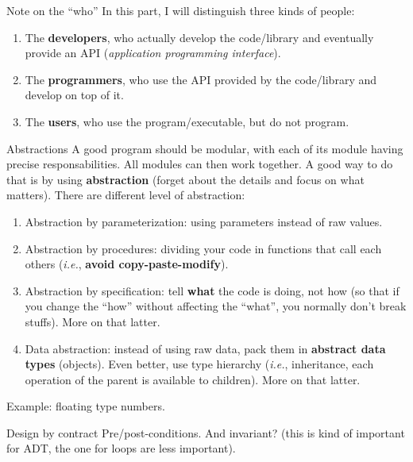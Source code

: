 \documentclass[10pt,
]{beamer}
\begin{document}
\begin{frame}{Note on the ``who''}
	In this  part, I will distinguish three kinds of people:\begin{enumerate}
		\item The \textbf{developers}, who actually develop the code/library and eventually provide an API (\textit{application programming interface}).
		\item The \textbf{programmers}, who use the API provided by the code/library and develop on top of it.
		\item The \textbf{users}, who use the program/executable, but do not program.
	\end{enumerate}
\end{frame}

\begin{frame}{Abstractions}
	A good program should be modular, with each of its module having precise responsabilities. All modules can then work together. A good way to do that is by using \textbf{abstraction} (forget about the details and focus on what matters). There are different level of abstraction:
	\begin{enumerate}
		\item Abstraction by parameterization: using parameters instead of raw values.
		\item Abstraction by procedures: dividing your code in functions that call each others (\textit{i.e.}, \textbf{avoid copy-paste-modify}).
		\item Abstraction by specification: tell \textbf{what} the code is doing, not how (so that if you change the ``how'' without affecting the ``what'', you normally don't break stuffs). More on that latter.
		\item Data abstraction: instead of using raw data, pack them in \textbf{abstract data types} (objects). Even better, use type hierarchy (\textit{i.e.}, inheritance, each operation of the parent is available to children). More on that latter.
	\end{enumerate}
\end{frame}

\begin{frame}
	Example: floating type numbers.
\end{frame}

\begin{frame}{Design by contract}
	Pre/post-conditions. And invariant? (this is kind of important for ADT, the one for loops are less important).
\end{frame}
\end{document}
